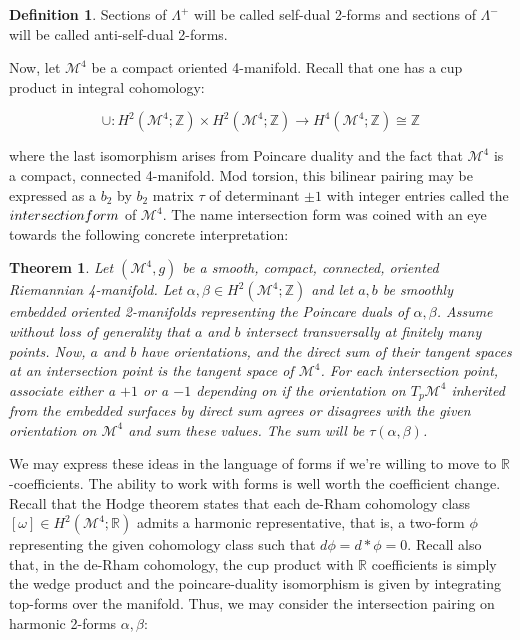 \documentclass[openany, amssymb, psamsfonts]{amsart}
\newtheorem{thm}{Theorem}[section]
\theoremstyle{definition}
\newtheorem{defn}{Definition}[section]
\numberwithin{equation}{section}
\begin{document}
    \begin{defn}
    Sections of $\Lambda^+$ will be called self-dual 2-forms and sections of $\Lambda^-$ will be called anti-self-dual 2-forms. 
    \end{defn}

    Now, let $\mathcal{M}^4$ be a compact oriented 4-manifold. Recall that one has a cup product in integral cohomology:

    $$\cup: H^2(\mathcal{M}^4; \mathbb{Z}) \times H^2(\mathcal{M}^4; \mathbb{Z})  \rightarrow H^4(\mathcal{M}^4; \mathbb{Z}) \cong \mathbb{Z}$$

    where the last isomorphism arises from Poincare duality and the fact that $\mathcal{M}^4$ is a compact, connected 4-manifold. Mod torsion, this bilinear pairing may be expressed as a $b_2$ by $b_2$ matrix $\tau$ of determinant $\pm 1$ with integer entries called the $\emph{intersection form}$ of $\mathcal{M}^4$. The name intersection form was coined with an eye towards the following concrete interpretation:

    \begin{thm}

    Let $(\mathcal{M}^4, g)$ be a smooth, compact, connected, oriented Riemannian 4-manifold. Let $\alpha, \beta \in H^2(\mathcal{M}^4; \mathbb{Z})$ and let $a, b$ be smoothly embedded oriented 2-manifolds representing the Poincare duals of $\alpha, \beta$. Assume without loss of generality that $a$ and $b$ intersect transversally at finitely many points. Now, $a$ and $b$ have orientations, and the direct sum of their tangent spaces at an intersection point is the tangent space of $\mathcal{M}^4$. For each intersection point, associate either a $+1$ or a $-1$ depending on if the orientation on $T_p\mathcal{M}^4$ inherited from the embedded surfaces by direct sum agrees or disagrees with the given orientation on $\mathcal{M}^4$ and sum these values. The sum will be $\tau(\alpha, \beta)$. 

    \end{thm}

    We may express these ideas in the language of forms if we're willing to move to $\mathbb{R}$-coefficients. The ability to work with forms is well worth the coefficient change. Recall that the Hodge theorem states that each de-Rham cohomology class $[\omega] \in H^2(\mathcal{M}^4;\mathbb{R})$ admits a harmonic representative, that is, a two-form $\phi$ representing the given cohomology class such that $d\phi = d *\phi = 0$. Recall also that, in the de-Rham cohomology, the cup product with $\mathbb{R}$ coefficients is simply the wedge product and the poincare-duality isomorphism is given by integrating top-forms over the manifold. Thus, we may consider the intersection pairing on harmonic 2-forms $\alpha, \beta$:
\end{document}
